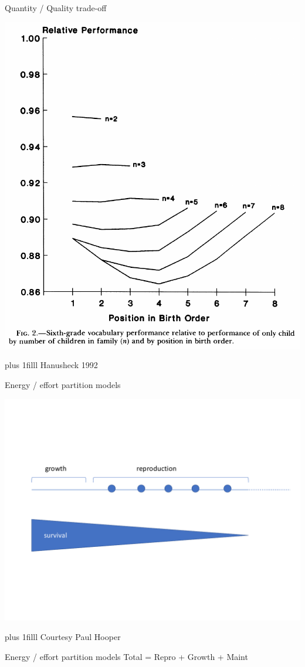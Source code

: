 \documentclass{beamer}
\newcommand{\btVFill}{\vskip0pt plus 1filll}
\begin{document}
\begin{frame}{Quantity / Quality trade-off}
  \begin{center}
    \includegraphics[width=.6\textwidth]{hanushek_1982_qqto.png}
  \end{center}
  \btVFill
  \small Hanusheck 1992\normalsize
\end{frame}

\begin{frame}{Energy / effort partition models}
  \begin{center}
    \includegraphics[page=2,width=.8\textwidth]{hooper_slides_condensed.pdf}
  \end{center}
  \btVFill
  \small Courtesy Paul Hooper\normalsize
\end{frame}

\begin{frame}{Energy / effort partition models}
  \Large Total = Repro + Growth + Maint\normalsize
\end{frame}
\end{document}
